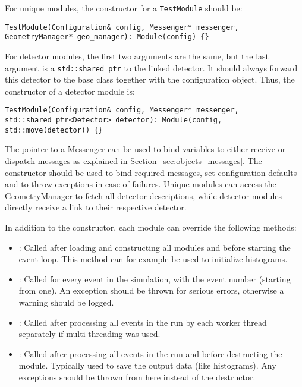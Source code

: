 For unique modules, the constructor for a \texttt{TestModule} should be:
\begin{verbatim}
TestModule(Configuration& config, Messenger* messenger, GeometryManager* geo_manager): Module(config) {}
\end{verbatim}

For detector modules, the first two arguments are the same, but the last argument is a \texttt{std::shared\_ptr} to the linked detector.
It should always forward this detector to the base class together with the configuration object.
Thus, the constructor of a detector module is:
\begin{verbatim}
TestModule(Configuration& config, Messenger* messenger, std::shared_ptr<Detector> detector): Module(config, std::move(detector)) {}
\end{verbatim}

The pointer to a Messenger can be used to bind variables to either receive or dispatch messages as explained in Section~\ref{sec:objects_messages}.
The constructor should be used to bind required messages, set configuration defaults and to throw exceptions in case of failures.
Unique modules can access the GeometryManager to fetch all detector descriptions, while detector modules directly receive a link to their respective detector.

In addition to the constructor, each module can override the following methods:
\begin{itemize}
\item {}: Called after loading and constructing all modules and before starting the event loop.
This method can for example be used to initialize histograms.
\item {}: Called for every event in the simulation, with the event number (starting from one).
An exception should be thrown for serious errors, otherwise a warning should be logged.
\item {}: Called after processing all events in the run by each worker thread separately if multi-threading was used.
\item {}: Called after processing all events in the run and before destructing the module.
Typically used to save the output data (like histograms).
Any exceptions should be thrown from here instead of the destructor.
\end{itemize}

